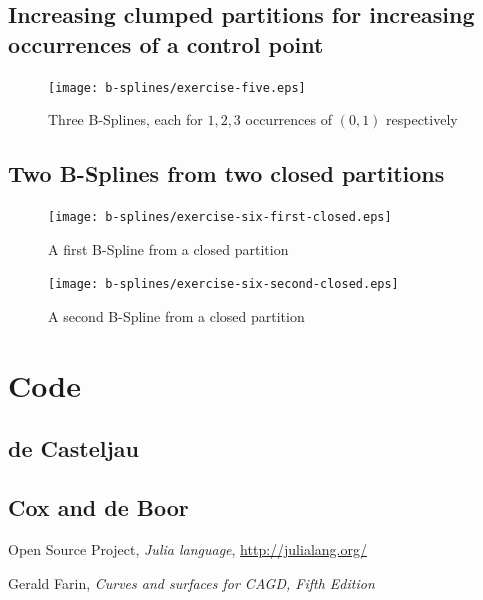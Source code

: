 \documentclass{article}
\begin{document}
\subsection{Increasing clumped partitions for increasing occurrences of a control point}
\begin{figure}[h!]
  \centering
  \texttt{[image: b-splines/exercise-five.eps]}
  \caption{Three B-Splines, each for $1,2,3$ occurrences of $(0,1)$ respectively }
  \label{fig:bspline-exercise-five}
\end{figure}

\subsection{Two B-Splines from two closed partitions}
\begin{figure}[h!]
  \centering
  \texttt{[image: b-splines/exercise-six-first-closed.eps]}
  \caption{A first B-Spline from a closed partition }
  \label{fig:bspline-exercise-six-first}
\end{figure}

\begin{figure}[h!]
  \centering
  \texttt{[image: b-splines/exercise-six-second-closed.eps]}
  \caption{A second B-Spline from a closed partition }
  \label{fig:bspline-exercise-six-second}
\end{figure}


\section{Code}

\subsection{de Casteljau}
\label{sec:deCasteljau-code}


\subsection{Cox and de Boor}
\label{sec:Cox-deBoor-code}


\newpage

\begin{thebibliography}{}

 Open Source Project,
  \emph{Julia language}, \url{http://julialang.org/}

 Gerald Farin,
  \textit{Curves and surfaces for CAGD, Fifth Edition}


\end{thebibliography}
\end{document}

